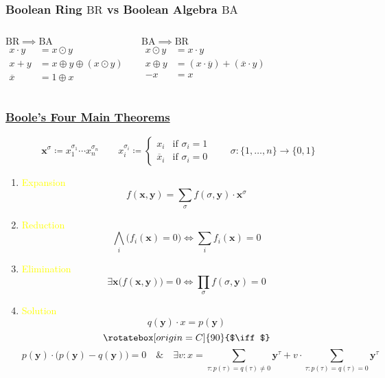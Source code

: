 \documentclass[UTF8,aspectratio=43,11pt,colorlinks,compress,openany]{beamer}%
\begin{document}
\begin{frame}\frametitle{Boolean Ring $\mathrm{BR}$ vs Boolean Algebra $\mathrm{BA}$}
	\begin{columns}
			\begin{block}{$\mathrm{BR} \implies \mathrm{BA}$}
			\setlength\abovedisplayskip{0pt}
				\begin{align*}
				x\cdot y&=x\odot y\\
				x+y&=x\oplus y\oplus(x\odot y)\\
				\overline{x}&=1\oplus x
				\end{align*}
			\end{block}
			\begin{block}{$\mathrm{BA} \implies \mathrm{BR}$}
			\setlength\abovedisplayskip{0pt}
				\begin{align*}
				x\odot y&=x\cdot y\\
				x\oplus y&=(x\cdot\overline{y})+(\overline{x}\cdot y)\\
				-x&=x
				\end{align*}
			\end{block}
	\end{columns}
\end{frame}

\begin{frame}\frametitle{\href{https://www.math.uwaterloo.ca/~snburris/htdocs/Theme2_talk_snburris.pdf}{Boole's Four Main Theorems}}
\setlength\abovedisplayskip{0pt}
\setlength\belowdisplayskip{0pt}\vspace{-1em}
	\[\mathbf{x}^\sigma\coloneqq x_1^{\sigma_1}\cdots x_n^{\sigma_n}\qquad x_i^{\sigma_i}\coloneqq 
	\begin{cases}
	x_i &\mbox{if } \sigma_i=1\\
	\overline{x}_i &\mbox{if } \sigma_i=0
	\end{cases}\qquad\sigma:\{1,\dots,n\}\to\{0,1\}\]
	\begin{enumerate}
		\item \textcolor{yellow}{Expansion}\vspace{-1em}
		\[f(\mathbf{x},\mathbf{y})=\sum_\sigma f(\sigma,\mathbf{y})\cdot \mathbf{x}^\sigma\]
		\item \textcolor{yellow}{Reduction}\vspace{-1em}
		\[\bigwedge_i\big(f_i(\mathbf{x})=0\big)\iff\sum_i f_i(\mathbf{x})=0\]
		\item \textcolor{yellow}{Elimination}\vspace{-1em}
		\[\exists \mathbf{x}\big(f(\mathbf{x},\mathbf{y})\big)=0\iff \prod_\sigma f(\sigma,\mathbf{y})=0\]
		\item \textcolor{yellow}{Solution}\vspace{-1em}
		\[q(\mathbf{y})\cdot x=p(\mathbf{y})\]
		\[\rotatebox[origin=C]{90}{$\iff$}\]
		\[p(\mathbf{y})\cdot\big(p(\mathbf{y})-q(\mathbf{y})\big)=0\quad\&\quad \exists v: x=\!\!\!\sum\limits_{\tau: p(\tau)=q(\tau)\neq 0}\!\!\!\!\!\mathbf{y}^\tau+v\cdot \!\!\!\!\!\sum\limits_{\tau: p(\tau)=q(\tau)=0}\!\!\!\!\!\mathbf{y}^\tau\]
	\end{enumerate}
\end{frame}
\end{document}
